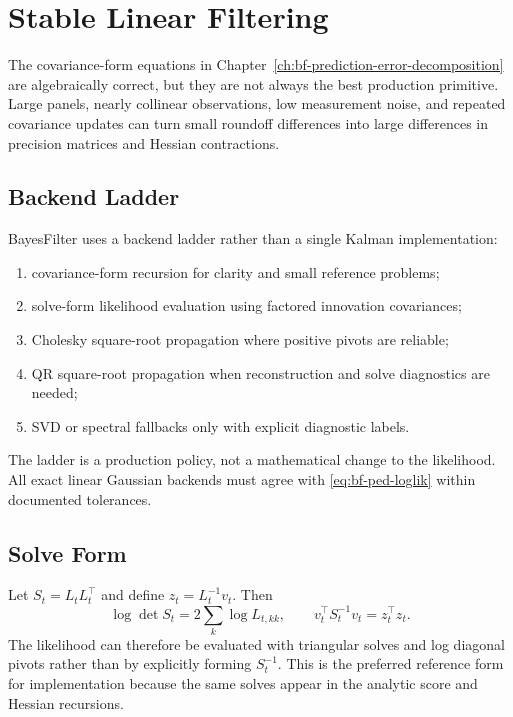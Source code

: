 \chapter{Stable Linear Filtering}
\label{ch:bf-stable-linear-filtering}

The covariance-form equations in Chapter~\ref{ch:bf-prediction-error-decomposition}
are algebraically correct, but they are not always the best production
primitive.  Large panels, nearly collinear observations, low measurement noise,
and repeated covariance updates can turn small roundoff differences into large
differences in precision matrices and Hessian contractions.

\section{Backend Ladder}
\label{sec:bf-linear-backend-ladder}

BayesFilter uses a backend ladder rather than a single Kalman implementation:
\begin{enumerate}[label=(\roman*)]
  \item covariance-form recursion for clarity and small reference problems;
  \item solve-form likelihood evaluation using factored innovation covariances;
  \item Cholesky square-root propagation where positive pivots are reliable;
  \item QR square-root propagation when reconstruction and solve diagnostics are
    needed;
  \item SVD or spectral fallbacks only with explicit diagnostic labels.
\end{enumerate}
The ladder is a production policy, not a mathematical change to the likelihood.
All exact linear Gaussian backends must agree with
\eqref{eq:bf-ped-loglik} within documented tolerances.

\section{Solve Form}
\label{sec:bf-solve-form-likelihood}

Let $S_t=L_tL_t^\top$ and define $z_t=L_t^{-1}v_t$.  Then
\[
  \log\det S_t = 2\sum_k \log L_{t,kk},
  \qquad
  v_t^\top S_t^{-1}v_t = z_t^\top z_t.
\]
The likelihood can therefore be evaluated with triangular solves and log
diagonal pivots rather than by explicitly forming $S_t^{-1}$.  This is the
preferred reference form for implementation because the same solves appear in
the analytic score and Hessian recursions.

